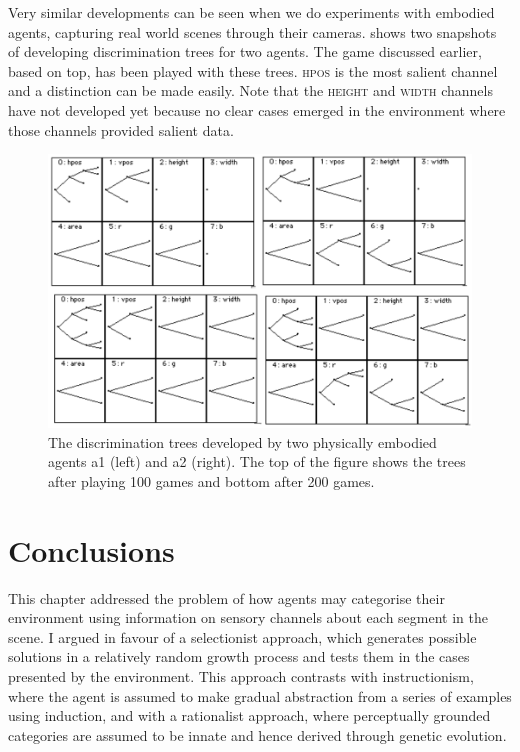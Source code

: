 Very similar developments can be seen when we do 
experiments with embodied agents, capturing real world scenes
through their cameras.  
shows two snapshots of developing discrimination trees
for two agents. The game discussed earlier, based on  top, 
has been played with these trees. 
\textsc{hpos} is the most salient channel and a distinction can 
be made easily. Note that the \textsc{height} and \textsc{width} channels have not 
developed yet because no clear cases emerged 
in the environment where those channels provided 
salient data. 

\begin{figure}[htbp]
  \centerline{\includegraphics[width=\textwidth]{chap4/figs/discri200.pdf}}
\caption{\label{discri200a}The discrimination trees 
developed by two physically embodied agents 
{\bfshape a1} (left) and {\bfshape a2} (right). The top of the 
figure shows the trees after 
playing 100 games and bottom after 200 games.}
\end{figure}

\section{Conclusions}

This chapter addressed the problem of how agents may 
categorise their environment using information 
on sensory channels about each segment in the scene. 
I argued in favour of a selectionist approach, which 
generates possible solutions in a relatively 
random growth process and tests them in the 
cases presented by the environment. 
This approach contrasts with instructionism, where
the agent is assumed to make gradual abstraction 
from a series of examples using induction, and with 
a rationalist approach, where perceptually grounded categories are
assumed to be innate and hence derived through 
genetic evolution. 

